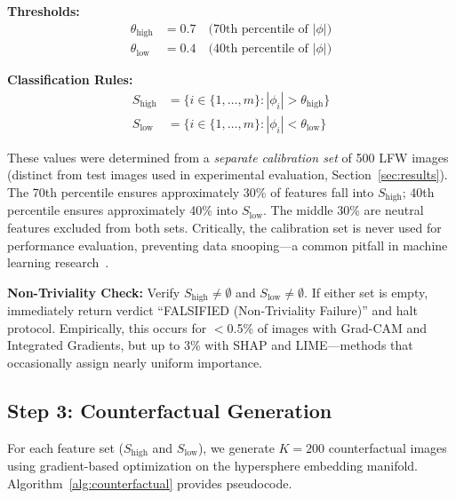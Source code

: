 \textbf{Thresholds:}
\begin{align}
\theta_{\text{high}} &= 0.7 \quad \text{(70th percentile of } |\phi| \text{)} \\
\theta_{\text{low}} &= 0.4 \quad \text{(40th percentile of } |\phi| \text{)}
\end{align}

\textbf{Classification Rules:}
\begin{align}
S_{\text{high}} &= \{i \in \{1, \ldots, m\} : |\phi_i| > \theta_{\text{high}}\} \\
S_{\text{low}} &= \{i \in \{1, \ldots, m\} : |\phi_i| < \theta_{\text{low}}\}
\end{align}

These values were determined from a \textit{separate calibration set} of 500 LFW images (distinct from test images used in experimental evaluation, Section~\ref{sec:results}). The 70th percentile ensures approximately 30\% of features fall into $S_{\text{high}}$; 40th percentile ensures approximately 40\% into $S_{\text{low}}$. The middle 30\% are neutral features excluded from both sets. Critically, the calibration set is never used for performance evaluation, preventing data snooping—a common pitfall in machine learning research~\cite{kaufman2012leakage}.

\textbf{Non-Triviality Check:} Verify $S_{\text{high}} \neq \emptyset$ and $S_{\text{low}} \neq \emptyset$. If either set is empty, immediately return verdict ``FALSIFIED (Non-Triviality Failure)'' and halt protocol. Empirically, this occurs for $<$0.5\% of images with Grad-CAM and Integrated Gradients, but up to 3\% with SHAP and LIME—methods that occasionally assign nearly uniform importance.

\subsection{Step 3: Counterfactual Generation}

For each feature set ($S_{\text{high}}$ and $S_{\text{low}}$), we generate $K=200$ counterfactual images using gradient-based optimization on the hypersphere embedding manifold. Algorithm~\ref{alg:counterfactual} provides pseudocode.

